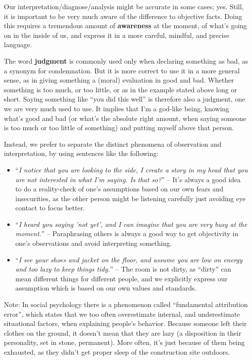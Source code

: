 Our interpretation/diagnose/analysis might be accurate in some cases; yes.
Still, it is important to be very much aware of the difference to objective facts.
Doing this requires a tremendous amount of \textbf{awareness} at the moment, of what's going on in the inside of us, and express it in a more careful, mindful, and precise language.

The word \textbf{judgment} is commonly used only when declaring something as bad, as a synonym for condemnation.
But it is more correct to use it in a more general sense, as in giving something a (moral) evaluation in good and bad.
Whether something is too much, or too little, or as in the example stated above long or short.
Saying something like ``you did this well'' is therefore also a judgment, one we are very much used to use.
It implies that I'm a god-like being, knowing what's good and bad (or what's the absolute right amount, when saying someone is too much or too little of something) and putting myself above that person.

Instead, we prefer to separate the distinct phenomena of observation and interpretation, by using sentences like the following:

\begin{itemize}
    \item ``\textit{I notice that you are looking to the side, I create a story in my head that you are not interested in what I'm saying. Is that so?}'' -- It's always a good idea to do a reality-check of one's assumptions based on our own fears and insecurities, as the other person might be listening carefully just avoiding eye contact to focus better.
    \item ``\textit{I heard you saying 'not yet', and I can imagine that you are very busy at the moment.}'' -- Paraphrasing others is always a good way to get objectivity in one's observations and avoid interpreting something.
    \item ``\textit{I see your shoes and jacket on the floor, and assume you are low on energy and too lazy to keep things tidy.}'' -- The room is not dirty, as ``dirty'' can mean different things for different people, and we explicitly express our assumption which is based on our own values and standards.
\end{itemize}

Note: In social psychology there is a phenomenon called ``fundamental attribution error'', which states that we too often overestimate internal, and underestimate situational factors, when explaining people's behavior.
Because someone left their clothes on the ground, it doesn't mean that they are lazy (a disposition in their personality, set in stone, permanent).
More often, it's just because of them being exhausted, as they didn't get proper sleep of the construction site outdoors.

